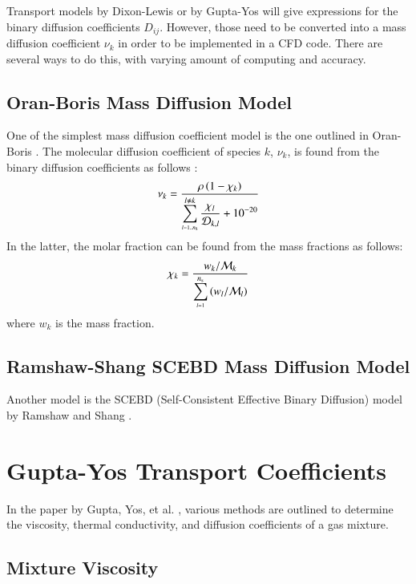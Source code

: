 \documentclass{warpdoc}
\newcommand{\rhos}{\rho}
\newcommand{\ns}{{{n}_{\rm s}}}
\newcommand{\mfa}{\scriptscriptstyle}
\newcommand{\mfd}{\displaystyle}
\begin{document}
Transport models by Dixon-Lewis or by Gupta-Yos will give expressions for the binary diffusion coefficients $D_{ij}$. However, those need to be converted into a mass diffusion coefficient $\nu_k$ in order to be implemented in a CFD code. There are several ways to do this, with varying amount of computing and accuracy.

\subsection{Oran-Boris Mass Diffusion Model}

One of the simplest mass diffusion coefficient model is the one outlined in Oran-Boris \cite{pces:1981:oran}.
The molecular diffusion coefficient of species $k$, $\nu_k$,
is found from the binary diffusion coefficients as follows \cite[Eq.\ (6.15)]{pces:1981:oran}:
%
\begin{equation}
\mfd\nu_k= \frac{\rhos \left( 1 - {\chi}_k \right)}
            {\mfd\sum_{\mfa l=1..\ns}^{l \neq k} \frac{{\chi}_l}{{\cal D}_{k,l}} +10^{-20}   }
\label{eqn:moldiff-nu}
\end{equation}
%
In the latter, the molar fraction can be found from the mass fractions as follows:
%
\begin{equation}
{\chi}_k= \mfd\frac{w_k / {\cal M}_k}
              {\mfd\sum_{\mfa l=1}^{\ns} \left( w_l / {\cal M}_l \right)}
\end{equation}
%
where $w_k$ is the mass fraction. 

\subsection{Ramshaw-Shang SCEBD Mass Diffusion Model}

Another model is the SCEBD (Self-Consistent Effective Binary Diffusion) model by Ramshaw and Shang \cite{jnet:1996:ramshaw}.








\section{Gupta-Yos Transport Coefficients}

In the paper by Gupta, Yos, et al. \cite{nasa:1990:gupta}, various methods are outlined to determine the viscosity, thermal conductivity, and diffusion coefficients of a gas mixture. 

\subsection{Mixture Viscosity}
\end{document}
